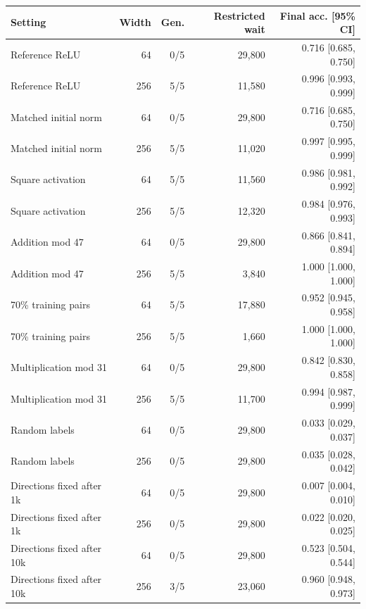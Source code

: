 \begin{tabular}{lrrr r}
\toprule
Setting & Width & Gen. & Restricted wait & Final acc. [95\% CI] \\
\midrule
Reference ReLU & 64 & 0/5 & 29,800 & 0.716 [0.685, 0.750] \\
Reference ReLU & 256 & 5/5 & 11,580 & 0.996 [0.993, 0.999] \\
Matched initial norm & 64 & 0/5 & 29,800 & 0.716 [0.685, 0.750] \\
Matched initial norm & 256 & 5/5 & 11,020 & 0.997 [0.995, 0.999] \\
Square activation & 64 & 5/5 & 11,560 & 0.986 [0.981, 0.992] \\
Square activation & 256 & 5/5 & 12,320 & 0.984 [0.976, 0.993] \\
Addition mod 47 & 64 & 0/5 & 29,800 & 0.866 [0.841, 0.894] \\
Addition mod 47 & 256 & 5/5 & 3,840 & 1.000 [1.000, 1.000] \\
70\% training pairs & 64 & 5/5 & 17,880 & 0.952 [0.945, 0.958] \\
70\% training pairs & 256 & 5/5 & 1,660 & 1.000 [1.000, 1.000] \\
Multiplication mod 31 & 64 & 0/5 & 29,800 & 0.842 [0.830, 0.858] \\
Multiplication mod 31 & 256 & 5/5 & 11,700 & 0.994 [0.987, 0.999] \\
Random labels & 64 & 0/5 & 29,800 & 0.033 [0.029, 0.037] \\
Random labels & 256 & 0/5 & 29,800 & 0.035 [0.028, 0.042] \\
Directions fixed after 1k & 64 & 0/5 & 29,800 & 0.007 [0.004, 0.010] \\
Directions fixed after 1k & 256 & 0/5 & 29,800 & 0.022 [0.020, 0.025] \\
Directions fixed after 10k & 64 & 0/5 & 29,800 & 0.523 [0.504, 0.544] \\
Directions fixed after 10k & 256 & 3/5 & 23,060 & 0.960 [0.948, 0.973] \\
\bottomrule
\end{tabular}